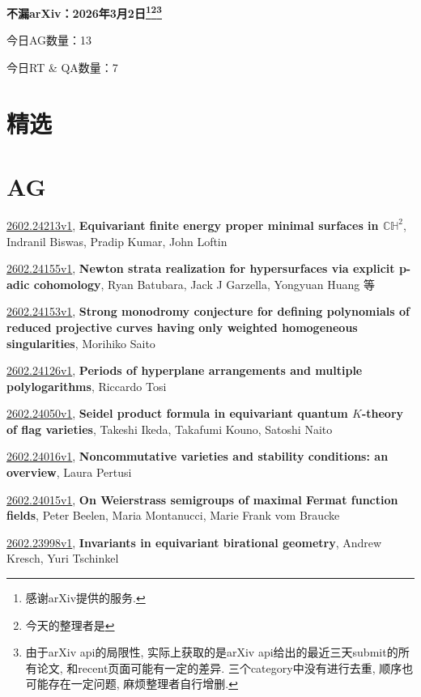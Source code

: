 \documentclass[9pt, a4paper]{article}
\theoremstyle{plain}
\theoremstyle{definition}
\theoremstyle{remark}
\newcommand{\arxiv}[3]{\href{https://arxiv.org/abs/#1}{#1}, \textbf{\textcolor{arxivblue}{#2}}, #3}
\newcommand{\AGnumber}{13}
\newcommand{\RTQAnumber}{7}
\newcommand{\NewestDate}{2026年3月2日}
\newcommand{\todayarXiver}{} %
\begin{document}
\begin{center}
    \Huge\textbf{不漏arXiv：\NewestDate\footnote{感谢arXiv提供的服务.}\footnote{今天的整理者是\todayarXiver}\footnote{由于arXiv api的局限性, 实际上获取的是arXiv api给出的最近三天submit的所有论文, 和recent页面可能有一定的差异. 三个category中没有进行去重, 顺序也可能存在一定问题, 麻烦整理者自行增删.}} \\
\end{center}

\setcounter{section}{-1}

\begin{center}
    今日AG数量：\AGnumber
    
    今日RT \& QA数量：\RTQAnumber
    
\end{center}


\section{精选}


\section{AG}
\arxiv{2602.24213v1}{Equivariant finite energy proper minimal surfaces in $\mathbb{CH}^2$}{Indranil Biswas, Pradip Kumar, John Loftin}

\arxiv{2602.24155v1}{Newton strata realization for hypersurfaces via explicit p-adic cohomology}{Ryan Batubara, Jack J Garzella, Yongyuan Huang 等}

\arxiv{2602.24153v1}{Strong monodromy conjecture for defining polynomials of reduced projective curves having only weighted homogeneous singularities}{Morihiko Saito}

\arxiv{2602.24126v1}{Periods of hyperplane arrangements and multiple polylogarithms}{Riccardo Tosi}

\arxiv{2602.24050v1}{Seidel product formula in equivariant quantum $K$-theory of flag varieties}{Takeshi Ikeda, Takafumi Kouno, Satoshi Naito}

\arxiv{2602.24016v1}{Noncommutative varieties and stability conditions: an overview}{Laura Pertusi}

\arxiv{2602.24015v1}{On Weierstrass semigroups of maximal Fermat function fields}{Peter Beelen, Maria Montanucci, Marie Frank vom Braucke}

\arxiv{2602.23998v1}{Invariants in equivariant birational geometry}{Andrew Kresch, Yuri Tschinkel}
\end{document}
